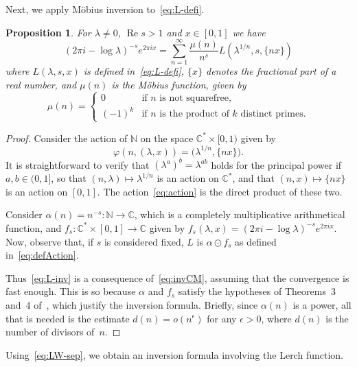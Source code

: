 \documentclass[11pt,a4paper,reqno]{amsart}
\newcommand{\C}{\mathbb{C}}
\newcommand{\N}{\mathbb{N}}
\renewcommand{\Re}{\operatorname{Re}}
\theoremstyle{plain}
\newtheorem{prop}[theorem]{Proposition}
\theoremstyle{remark}
\numberwithin{equation}{section}
\begin{document}
Next, we apply M\"obius inversion to~\eqref{eq:L-defi}.

\begin{prop}
\label{prop:L-inv}
For $\lambda \neq 0$, $\Re s > 1$ and $x \in [0,1]$ we have
%
\begin{equation}
\label{eq:L-inv}
	  (2 \pi i - \log \lambda)^{-s} e^{2\pi i x}
	= \sum_{n=1}^{\infty} \frac{\mu(n)}{n^{s}} L(\lambda^{1/n},s,\{nx\})
\end{equation}
% 
where $L(\lambda,s,x)$ is defined in~\eqref{eq:L-defi}, $\{x\}$ denotes the fractional part of a real number, and $\mu(n)$ is the M\"obius function, given by
\[
	  \mu(n)
	= \begin{cases}
	  0        & \text{if $n$ is not squarefree,}
	  \\
	  (-1)^{k} & \text{if $n$ is the product of $k$ distinct primes.}
	  \end{cases}
\]
\end{prop}

\begin{proof}
Consider the action of $\N$ on the space $\C^{*} \times [0,1)$ given by 
%
\begin{equation}
\label{eq:action}
	\varphi(n,(\lambda,x)) = \bigl(\lambda^{1/n}, \{nx\}\bigr). 
\end{equation}
%
It is straightforward to verify that $(\lambda^{a})^{b} = \lambda^{ab}$ holds for the principal power if $a,b \in (0,1]$, so that $(n,\lambda) \mapsto \lambda^{1/n}$ is an action on $\C^{*}$, and that $(n,x) \mapsto \{nx\}$ is an action on $[0,1]$. The action~\eqref{eq:action} is the direct product of these two.

Consider $\alpha(n) = n^{-s} : \N \to \C$, which is a completely multiplicative arithmetical function, and $f_{s} : \C^{*} \times [0,1] \to \C$ given by $f_{s}(\lambda,x) = (2 \pi i - \log \lambda)^{-s} e^{2\pi i x}$.
Now, observe that, if $s$ is considered fixed, $L$ is $\alpha \odot f_{s}$ as defined in~\eqref{eq:defAction}.


Thus~\eqref{eq:L-inv} is a consequence of~\eqref{eq:invCM}, assuming that the convergence is fast enough. This is so because $\alpha$ and $f_{s}$  satisfy the hypotheses of Theorems~3 and~4 of~\cite{BNV}, which justify the inversion formula. Briefly, since $\alpha(n)$ is a power, all that is needed is the estimate
$d(n) = o(n^{\epsilon})$ for any $\epsilon > 0$, where $d(n)$ is the number of divisors of~$n$.
\end{proof}


Using~\eqref{eq:LW-sep}, we obtain an inversion formula involving the Lerch function. 
\end{document}

